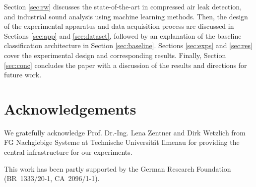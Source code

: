 \documentclass[a4paper,12pt]{article}
\begin{document}
Section \ref{sec:rw} discusses the state-of-the-art in compressed air leak detection, and industrial sound analysis using machine learning methods. Then, the design of the experimental apparatus and data acquisition process are discussed in Sections \ref{sec:app} and \ref{sec:dataset}, followed by an explanation of the baseline classification architecture in Section \ref{sec:baseline}. Sections \ref{sec:exps} and \ref{sec:res} cover the experimental design and corresponding results. Finally, Section \ref{sec:conc} concludes the paper with a discussion of the results and directions for future work.






\section{Acknowledgements}
We gratefully acknowledge Prof. Dr.-Ing. Lena Zentner and Dirk Wetzlich from FG Nachgiebige Systeme at Technische Universität Ilmenau for providing the central infrastructure for our experiments. 

This work has been partly supported by the German Research Foundation (\mbox{BR 1333/20-1}, \mbox{CA 2096/1-1}).

 

\end{document}
